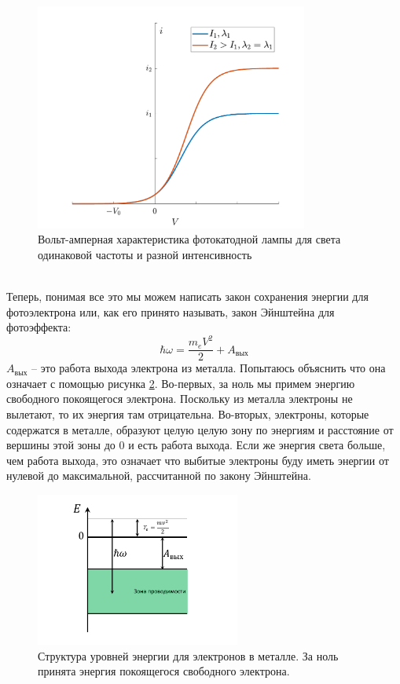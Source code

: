\documentclass[12pt]{article}
\begin{document}
\begin{figure}[h]
    \centering
    \includegraphics[width=0.8\textwidth,keepaspectratio]{Seminar_02/pics/pic_01.pdf}
    \caption{Вольт-амперная характеристика фотокатодной лампы для света одинаковой частоты и разной интенсивность}
    \label{fig:sem_02_photocatod_VAX}
\end{figure}
\\
Теперь, понимая все это мы можем написать закон сохранения энергии для фотоэлектрона или, как его принято называть, закон Эйнштейна для фотоэффекта:
\begin{equation}
    \hbar \omega = \dfrac{m_eV^2}{2} + A_{\text{вых}}
\end{equation}
$A_{\text{вых}}$  -- это работа выхода электрона из металла. Попытаюсь объяснить что она означает с помощью рисунка \ref{fig:sem_02_electron_energy}. Во-первых, за ноль мы примем энергию свободного покоящегося электрона. Поскольку из металла электроны не вылетают, то их энергия там отрицательна. Во-вторых, электроны, которые содержатся в металле, образуют целую целую зону по энергиям и расстояние от вершины этой зоны до 0 и есть работа выхода. Если же энергия света больше, чем работа выхода, это означает что выбитые электроны буду иметь энергии от нулевой до максимальной, рассчитанной по закону Эйнштейна.
\begin{figure}[h]
    \centering
    \includegraphics[width=0.6\textwidth,keepaspectratio]{Seminar_02/pics/pic_02.pdf}
    \caption{Структура уровней энергии для электронов в металле. За ноль принята энергия покоящегося свободного электрона.}
    \label{fig:sem_02_electron_energy}
\end{figure}
\end{document}
